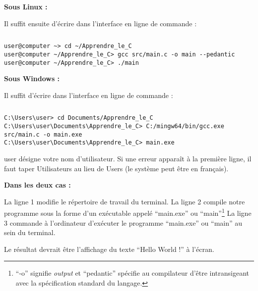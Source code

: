 \documentclass[../../main.tex]{subfiles}
\begin{document}
\textbf{Sous Linux :}

Il suffit ensuite d'écrire dans l'interface en ligne de commande :
\begin{lstlisting}[title=Compiler sous Linux]
\end{lstlisting}
\begin{verbatim}
user@computer ~> cd ~/Apprendre_le_C
user@computer ~/Apprendre_le_C> gcc src/main.c -o main --pedantic
user@computer ~/Apprendre_le_C> ./main
\end{verbatim}

\textbf{Sous Windows :}

Il suffit d'écrire dans l'interface en ligne de commande :
\begin{lstlisting}[title=Compiler sous Windows]
\end{lstlisting}
\begin{verbatim}
C:\Users\user> cd Documents/Apprendre_le_C
C:\Users\user\Documents\Apprendre_le_C> C:/mingw64/bin/gcc.exe src/main.c -o main.exe
C:\Users\user\Documents\Apprendre_le_C> main.exe
\end{verbatim}
\og user \fg{} désigne votre nom d'utilisateur. Si une erreur apparaît à la première ligne, il faut taper \textsf{Utilisateurs} au lieu de \textsf{Users} (le système peut être en français).

\textbf{Dans les deux cas :}

La ligne 1 modifie le répertoire de travail du terminal. \newline
La ligne 2 compile notre programme sous la forme d'un exécutable appelé ``main.exe'' ou ``main''\footnote{``-o'' signifie \textit{output} et ``pedantic'' spécifie au compilateur d'être intransigeant avec la spécification standard du langage.}\newline
La ligne 3 commande à l'ordinateur d'exécuter le programme ``main.exe'' ou ``main'' au sein du terminal.

Le résultat devrait être l'affichage du texte ``Hello World !'' à l'écran.
\end{document}
